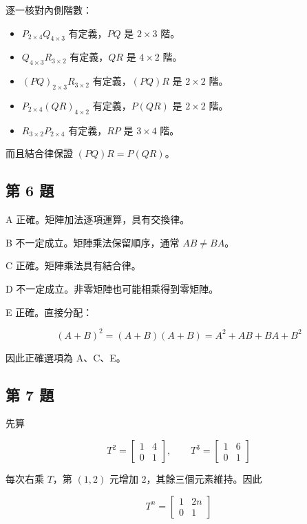 \documentclass[11pt,a4paper]{article}
\providecommand{\tightlist}{%
  \setlength{\itemsep}{0pt}\setlength{\parskip}{0pt}}
\begin{document}
逐一核對內側階數：

\begin{itemize}
\tightlist
\item
  \(P_{2\times4}Q_{4\times3}\) 有定義，\(PQ\) 是 \(2\times3\) 階。
\item
  \(Q_{4\times3}R_{3\times2}\) 有定義，\(QR\) 是 \(4\times2\) 階。
\item
  \((PQ)_{2\times3}R_{3\times2}\) 有定義，\((PQ)R\) 是 \(2\times2\) 階。
\item
  \(P_{2\times4}(QR)_{4\times2}\) 有定義，\(P(QR)\) 是 \(2\times2\) 階。
\item
  \(R_{3\times2}P_{2\times4}\) 有定義，\(RP\) 是 \(3\times4\) 階。
\end{itemize}

而且結合律保證 \((PQ)R=P(QR)\)。

\subsection{第 6 題}\label{ux7b2c-6-ux984c}

A 正確。矩陣加法逐項運算，具有交換律。

B 不一定成立。矩陣乘法保留順序，通常 \(AB\ne BA\)。

C 正確。矩陣乘法具有結合律。

D 不一定成立。非零矩陣也可能相乘得到零矩陣。

E 正確。直接分配：

\[
(A+B)^2=(A+B)(A+B)=A^2+AB+BA+B^2
\]

因此正確選項為 A、C、E。

\subsection{第 7 題}\label{ux7b2c-7-ux984c}

先算

\[
T^2=\begin{bmatrix}1&4\\0&1\end{bmatrix},
\qquad
T^3=\begin{bmatrix}1&6\\0&1\end{bmatrix}
\]

每次右乘 \(T\)，第 \((1,2)\) 元增加 \(2\)，其餘三個元素維持。因此

\[
T^n=\begin{bmatrix}1&2n\\0&1\end{bmatrix}
\]
\end{document}
